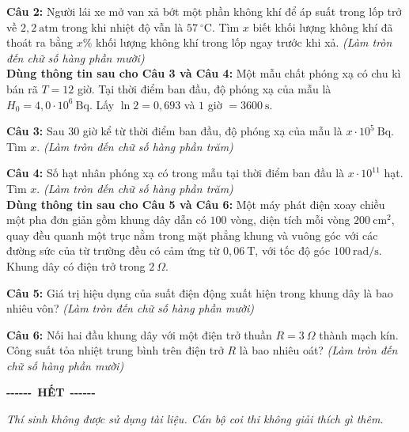 \documentclass[12pt,a4paper]{article}
\begin{document}
\begin{minipage}{\textwidth}
\noindent \textbf{Câu 2:} Người lái xe mở van xả bớt một phần không khí để áp suất trong lốp trở về $2{,}2\ \text{atm}$ trong khi nhiệt độ vẫn là $57\ ^{\circ}\text{C}$. Tìm $x$ biết khối lượng không khí đã thoát ra bằng $x\%$ khối lượng không khí trong lốp ngay trước khi xả. \textit{(Làm tròn đến chữ số hàng phần mười)}\\

\noindent \textbf{Dùng thông tin sau cho Câu 3 và Câu 4:} Một mẫu chất phóng xạ có chu kì bán rã $T = 12$ giờ. Tại thời điểm ban đầu, độ phóng xạ của mẫu là $H_0 = 4{,}0 \cdot 10^{6}\ \text{Bq}$. Lấy $\ln 2 = 0{,}693$ và $1$ giờ $= 3600\ \text{s}$.\\\par\nopagebreak[4]
\end{minipage}


\begin{minipage}{\textwidth}
\noindent \textbf{Câu 3:} Sau $30$ giờ kể từ thời điểm ban đầu, độ phóng xạ của mẫu là $x \cdot 10^{5}\ \text{Bq}$. Tìm $x$. \textit{(Làm tròn đến chữ số hàng phần trăm)}
\end{minipage}


\begin{minipage}{\textwidth}
\noindent \textbf{Câu 4:} Số hạt nhân phóng xạ có trong mẫu tại thời điểm ban đầu là $x \cdot 10^{11}$ hạt. Tìm $x$. \textit{(Làm tròn đến chữ số hàng phần trăm)}\\

\noindent \textbf{Dùng thông tin sau cho Câu 5 và Câu 6:} Một máy phát điện xoay chiều một pha đơn giản gồm khung dây dẫn có $100$ vòng, diện tích mỗi vòng $200\ \text{cm}^2$, quay đều quanh một trục nằm trong mặt phẳng khung và vuông góc với các đường sức của từ trường đều có cảm ứng từ $0{,}06\ \text{T}$, với tốc độ góc $100\ \text{rad/s}$. Khung dây có điện trở trong $2\ \Omega$.\\\par\nopagebreak[4]
\end{minipage}


\begin{minipage}{\textwidth}
\noindent \textbf{Câu 5:} Giá trị hiệu dụng của suất điện động xuất hiện trong khung dây là bao nhiêu vôn? \textit{(Làm tròn đến chữ số hàng phần mười)}
\end{minipage}


\begin{minipage}{\textwidth}
\noindent \textbf{Câu 6:} Nối hai đầu khung dây với một điện trở thuần $R = 3\ \Omega$ thành mạch kín. Công suất tỏa nhiệt trung bình trên điện trở $R$ là bao nhiêu oát? \textit{(Làm tròn đến chữ số hàng phần mười)}\\\vspace{0.6cm}
\begin{center}
{\bfseries -{}-{}-{}-{}-{}-}\ \textbf{HẾT}\ {\bfseries -{}-{}-{}-{}-{}-}
\end{center}
\vspace{0.15cm}
{\small\itshape
Thí sinh không được sử dụng tài liệu. Cán bộ coi thi không giải thích gì thêm.}

\end{minipage}
\end{document}
